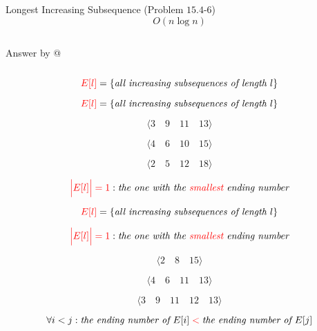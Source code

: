 \begin{frame}{}
  \begin{exampleblock}{Longest Increasing Subsequence (Problem $15.4$-$6$)}
    \[
      O(n \log n)
    \]
  \end{exampleblock}

  \begin{columns}
    \pause
    \pause
      \centerline{Answer by  @ }
  \end{columns}
\end{frame}

\begin{frame}{}
  \[
    \textcolor{red}{E[l]} = \left\{\text{\it all increasing subsequences of length $l$}\right\}
  \]

  \pause

  
\end{frame}

\begin{frame}{}
  \[
    \textcolor{red}{E[l]} = \left\{\text{\it all increasing subsequences of length $l$}\right\}
  \]

  \pause
  \[
    \langle 3\quad 9\quad 11\quad 13 \rangle
  \]

  \[
    \langle 4\quad 6\quad 10\quad 15 \rangle
  \]

  \[
    \langle 2\quad 5\quad 12\quad 18 \rangle
  \]

  \pause
  \[
    \textcolor{red}{\Big|E[l]\Big| = 1}: \text{\it the one with the \textcolor{red}{\it smallest} ending number}
  \]
\end{frame}

\begin{frame}{}
  
\end{frame}

\begin{frame}{}
  \[
    \textcolor{red}{E[l]} = \left\{\text{\it all increasing subsequences of length $l$}\right\}
  \]

  \[
    \textcolor{red}{\Big|E[l]\Big| = 1}: \text{\it the one with the \textcolor{red}{\it smallest} ending number}
  \]

  \pause
  \[
    \langle 2\quad 8\quad 15 \rangle
  \]
  
  \[
    \langle 4\quad 6\quad 11\quad 13 \rangle
  \]

  \[
    \langle 3\quad 9\quad 11\quad 12\quad 13 \rangle
  \]

  \pause
  \[
    \forall i < j: \text{\it the ending number of } E[i] \;\textcolor{red}{<}\; \text{\it the ending number of } E[j]
  \]
\end{frame}

